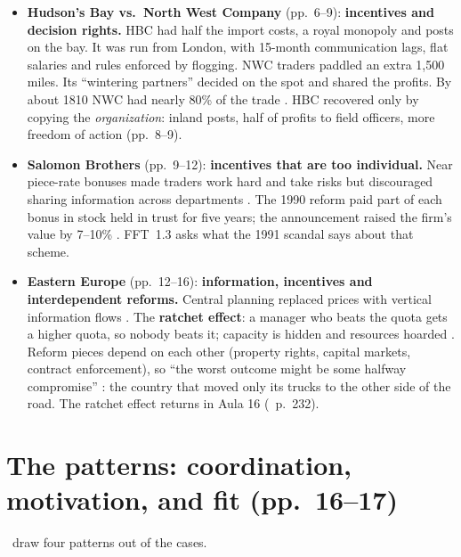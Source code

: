 \begin{itemize}
  \item \textbf{Hudson's Bay vs.\ North West Company} (pp.~6--9): \textbf{incentives and decision
    rights.} HBC had half the import costs, a royal monopoly and posts on the bay. It was run from
    London, with 15-month communication lags, flat salaries and rules enforced by flogging. NWC
    traders paddled an extra 1,500 miles. Its ``wintering partners'' decided on the spot and
    shared the profits. By about 1810 NWC had nearly 80\% of the trade . HBC recovered only
    by copying the \emph{organization}: inland posts, half of profits to field officers, more
    freedom of action (pp.~8--9).
  \item \textbf{Salomon Brothers} (pp.~9--12): \textbf{incentives that are too individual.} Near
    piece-rate bonuses made traders work hard and take risks but discouraged sharing information
    across departments . The 1990 reform paid part of each bonus in stock held in trust for
    five years; the announcement raised the firm's value by 7--10\% . FFT~1.3  asks
    what the 1991 scandal says about that scheme.
  \item \textbf{Eastern Europe} (pp.~12--16): \textbf{information, incentives and interdependent
    reforms.} Central planning replaced prices with vertical information flows . The
    \textbf{ratchet effect}: a manager who beats the quota gets a higher quota, so nobody beats it;
    capacity is hidden and resources hoarded . Reform pieces depend on each other (property
    rights, capital markets, contract enforcement), so ``the worst outcome might be some halfway
    compromise'' : the country that moved only its trucks to the other side of the road.
    The ratchet effect returns in Aula 16 (\MR\ p.~232).
\end{itemize}

\section{The patterns: coordination, motivation, and fit (pp.~16--17)}\label{sec:a1-patterns}

\MR\ draw four patterns out of the cases.

